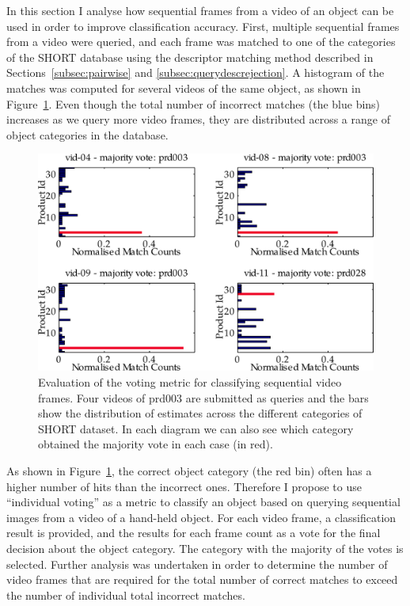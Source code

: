 In this section I analyse how sequential frames from a video of an object can be used in order to improve classification accuracy. First, multiple sequential frames from a video were queried, and each frame was matched to one of the categories of the SHORT database using the descriptor matching method described in Sections~\ref{subsec:pairwise} and \ref{subsec:querydescrejection}. A histogram of the matches was computed for several videos of the same object, as shown in Figure~\ref{fig:prd003a}. Even though the total number of incorrect matches (the blue bins) increases as we query more video frames, they are distributed across a range of object categories in the database. 

\begin{figure}[h!]
\centering
\includegraphics[width=\linewidth]{./gfx/Chapter03/prd003_distribution_bar-latex.pdf}
\caption{Evaluation of the voting metric for classifying sequential video frames. Four videos of prd003 are submitted as queries and the bars show the distribution of estimates across the different categories of SHORT dataset. In each diagram we can also see which category obtained the majority vote in each case (in red).}
\label{fig:prd003a}
\end{figure}


As shown in Figure~\ref{fig:prd003a}, the correct object category (the red bin) often has a higher number of hits than the incorrect ones. Therefore I propose to use ``individual voting'' as a metric to classify an object based on querying sequential images from a video of a hand-held object. For each video frame, a classification result is provided, and the results for each frame count as a vote for the final decision about the object category. The category with the majority of the votes is selected. Further analysis was undertaken in order to determine the number of video frames that are required for the total number of correct matches to exceed the number of individual total incorrect matches.

